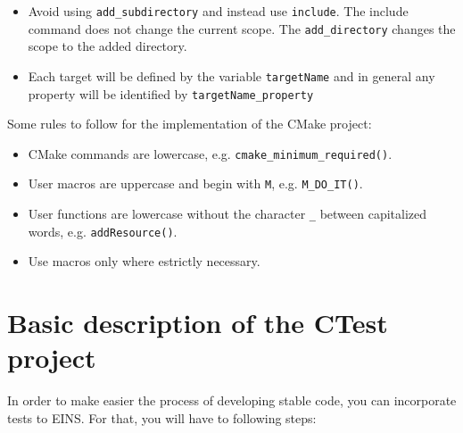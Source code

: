 \documentclass[a4paper,11pt]{report}
\begin{document}
\begin{itemize}
\item Avoid using \verb!add_subdirectory! and instead use
  \verb!include!. The include command does not change the current
  scope. The \verb!add_directory! changes the scope to the added
  directory.
\item Each target will be defined by the variable \verb!targetName!
  and in general any property will be identified by
  \verb!targetName_property!
\end{itemize}

\noindent Some rules to follow for the implementation of the CMake project:

\begin{itemize}
\item CMake commands are lowercase, e.g. \verb!cmake_minimum_required()!.
\item User macros are uppercase and begin with \verb!M!, e.g. \verb!M_DO_IT()!.
\item User functions are lowercase without the character \verb!_! between
  capitalized words, e.g. \verb!addResource()!.
\item Use macros only where estrictly necessary.  
\end{itemize}

\section{Basic description of the CTest project}

In order to make easier the process of developing stable code, you can
incorporate tests to EINS. For that, you will have to following steps:

\end{document}
